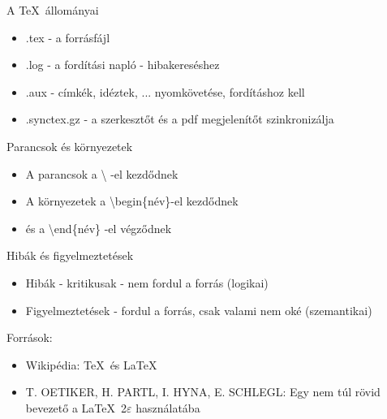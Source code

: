 \documentclass[11pt]{beamer}
\begin{document}
\begin{frame}{A \TeX \ állományai}
\begin{itemize}
\item .tex - a forrásfájl
\item .log - a fordítási napló - hibakereséshez
\item .aux - címkék, idéztek, ... nyomkövetése, fordításhoz kell
\item .synctex.gz - a szerkesztőt és a pdf megjelenítőt szinkronizálja
\end{itemize}
\end{frame}

\begin{frame}{Parancsok és környezetek}
\begin{itemize}
\item	A parancsok a {\color{red}\textbackslash} -el kezdődnek
\item	A környezetek a {\color{blue}\textbackslash begin\{név\}}-el kezdődnek
\item	és a {\color{blue}\textbackslash end\{név\}} -el végződnek
\end{itemize}
\end{frame}

\begin{frame}{Hibák és figyelmeztetések}
\begin{itemize}
\item {\color{red}Hibák} - kritikusak - nem fordul a forrás (logikai)
\item {\color{blue}Figyelmeztetések} - fordul a forrás, csak valami nem oké (szemantikai)
\end{itemize}
\end{frame}

\begin{frame}{Források:}
\begin{itemize}
\item Wikipédia: \TeX \ és \LaTeX
\item T. OETIKER, H. PARTL, I. HYNA, E. SCHLEGL: Egy nem túl rövid bevezető a \LaTeX \ 2$\varepsilon$ használatába
\end{itemize}
\end{frame}
\end{document}
